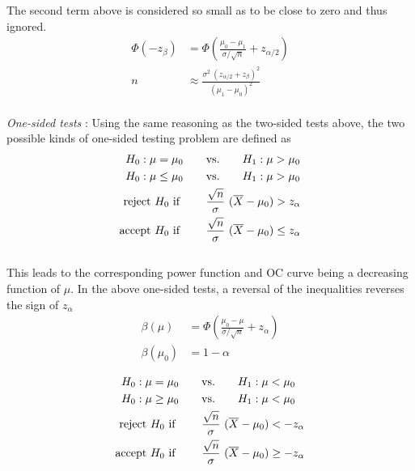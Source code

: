 The second term above is considered so small as to be close to zero and thus ignored.\\

\begin{align}
	\Phi(-z_\beta) &= \Phi\left(\frac{\mu_0 - \mu_1}{\sigma/\sqrt{n}} + z_{\alpha/2}\right) \nonumber \\
	n &\approx \frac{\sigma^2\ (z_{\alpha/2} + z_\beta)^2}{(\mu_1 - \mu_0)^2}
\end{align}\\

\textit{One-sided tests} : Using the same reasoning as the two-sided tests above, the two possible kinds of one-sided testing problem are defined as\\

\begin{align}
	H_0 : \mu = \mu_0 \qquad &\text{vs.} \qquad H_1 : \mu > \mu_0 \nonumber \\
	H_0 : \mu \leq \mu_0 \qquad &\text{vs.} \qquad H_1 : \mu > \mu_0 \nonumber \\
	\text{reject $ H_0 $ if } \qquad & \frac{\sqrt{n}}{\sigma}\ (\overline{X} - \mu_0)  > z_{\alpha} \nonumber \\
	\text{accept $ H_0 $ if } \qquad & \frac{\sqrt{n}}{\sigma}\  (\overline{X} - \mu_0)  \leq z_{\alpha}
\end{align} \\

This leads to the corresponding power function and OC curve being a decreasing function of $ \mu $. In the above one-sided tests, a reversal of the inequalities reverses the sign of $ z_\alpha $\\

\begin{align}
	\beta(\mu) &= \Phi\left(\frac{\mu_0 - \mu}{\sigma/\sqrt{n}} + z_{\alpha}\right) \\
	\beta(\mu_0) &= 1 - \alpha
\end{align}

\begin{align}
	H_0 : \mu = \mu_0 \qquad &\text{vs.} \qquad H_1 : \mu < \mu_0 \nonumber \\
	H_0 : \mu \geq \mu_0 \qquad &\text{vs.} \qquad H_1 : \mu < \mu_0  \nonumber \\
	\text{reject $ H_0 $ if } \qquad & \frac{\sqrt{n}}{\sigma}\ (\overline{X} - \mu_0)  < -z_{\alpha} \nonumber \\
	\text{accept $ H_0 $ if } \qquad & \frac{\sqrt{n}}{\sigma}\  (\overline{X} - \mu_0)  \geq -z_{\alpha}
\end{align} \\

